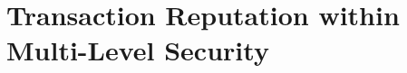 \chapter{Transaction Reputation within Multi-Level Security}\label{chap:multi_level_security}






